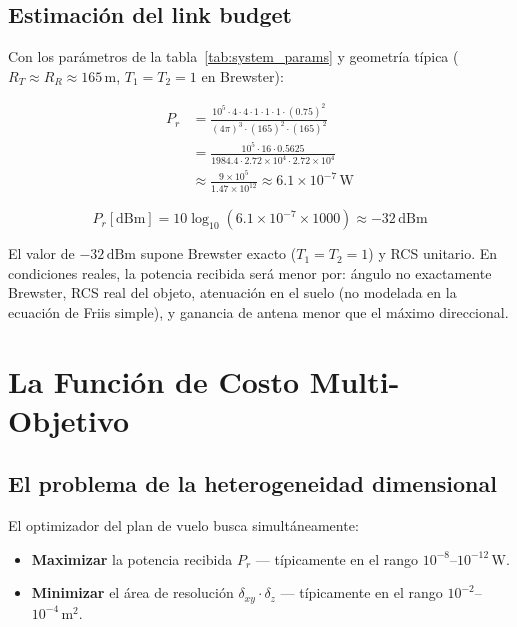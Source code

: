 \documentclass[12pt,a4paper,oneside]{book}
\newcommand{\nota}[2]{%
  \begin{tcolorbox}[enhanced, breakable,
    colback=green!5, colframe=green!50!black,
    fonttitle=\bfseries\small,
    title={\protect#1}]
    #2
  \end{tcolorbox}}
\newcommand{\RT}{R_T}
\newcommand{\RR}{R_R}
\newcommand{\Prcv}{P_r}
\newcommand{\dxy}{\delta_{xy}}
\newcommand{\dz}{\delta_z}
\begin{document}
\section{Estimación del link budget}

Con los parámetros de la tabla~\ref{tab:system_params} y geometría típica ($\RT\approx\RR\approx 165\,\text{m}$, $T_1=T_2=1$ en Brewster):

\begin{align*}
\Prcv &= \frac{10^5 \cdot 4 \cdot 4 \cdot 1 \cdot 1 \cdot 1 \cdot (0.75)^2}{(4\pi)^3 \cdot (165)^2 \cdot (165)^2}\\
    &= \frac{10^5 \cdot 16 \cdot 0.5625}{1984.4 \cdot 2.72\times10^4 \cdot 2.72\times10^4}\\
    &\approx \frac{9\times10^5}{1.47\times10^{12}} \approx 6.1\times10^{-7}\,\text{W}
\end{align*}

\[
\Prcv[\text{dBm}] = 10\log_{10}(6.1\times10^{-7}\times1000) \approx -32\,\text{dBm}
\]

\nota{Nota sobre la estimación}{
El valor de $-32\,\text{dBm}$ supone Brewster exacto ($T_1=T_2=1$) y RCS unitario.
En condiciones reales, la potencia recibida será menor por: ángulo no exactamente Brewster,
RCS real del objeto, atenuación en el suelo (no modelada en la ecuación de Friis simple),
y ganancia de antena menor que el máximo direccional.
}

\chapter{La Función de Costo Multi-Objetivo}

\section{El problema de la heterogeneidad dimensional}

El optimizador del plan de vuelo busca simultáneamente:
\begin{itemize}
  \item \textbf{Maximizar} la potencia recibida $\Prcv$ — típicamente en el rango $10^{-8}$–$10^{-12}\,\text{W}$.
  \item \textbf{Minimizar} el área de resolución $\dxy\cdot\dz$ — típicamente en el rango $10^{-2}$–$10^{-4}\,\text{m}^2$.
\end{itemize}
\end{document}
